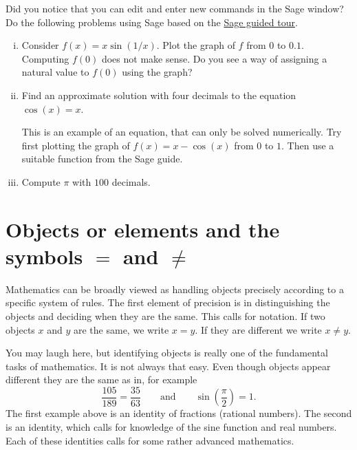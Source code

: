\begin{exercise}
  Did you notice that you can edit and enter new commands in the Sage window?
  Do the following problems using Sage based on the \href{http://doc.sagemath.org/html/en/tutorial/tour.html}{Sage guided tour}.

  \begin{enumerate}[(i)]
    \item Consider $f(x) = x \sin(1/x)$. Plot the graph of $f$ from $0$ to $0.1$. Computing $f(0)$ does not make sense. Do you
          see a way of assigning a natural value to $f(0)$ using the graph?
    \item Find an approximate solution with four decimals to the equation $\cos(x) = x$.

          \begin{hint}
            This is an example of an equation, that can only be solved numerically.
            Try first plotting the graph of $f(x) = x - \cos(x)$ from $0$ to $1$. Then use a
            suitable function from the Sage guide.
          \end{hint}
    \item Compute $\pi$ with $100$ decimals.
  \end{enumerate}

\end{exercise}






\section{Objects or elements and the symbols $=$ and $\neq$}\label{eqobjects}

Mathematics can be broadly viewed as handling objects precisely
according to a specific system of rules. The first element
of precision is in distinguishing the objects and deciding when
they are the same. This calls for notation. If two objects
$x$ and $y$ are the same, we write $x = y$. If they are different
we write $x\neq y$.

You may laugh here, but identifying objects is really one of the fundamental tasks of mathematics.
It is not always that easy. Even though objects appear different they are the same as
in, for example
$$
  \frac{105}{189} = \frac{35}{63}\qquad\text{and}\qquad \sin\left(\frac{\pi}{2}\right) = 1.
$$
The first example above is an identity of fractions (rational numbers). The second is
an identity, which calls for knowledge of the sine function and real numbers. Each of these
identities calls for some rather advanced mathematics.

